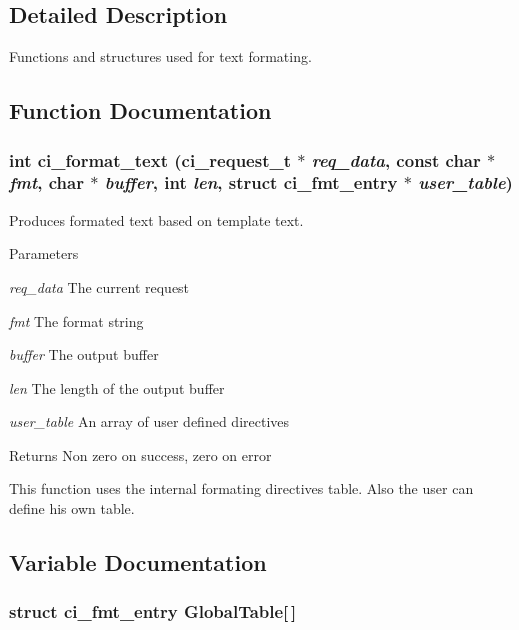 \subsection{Detailed Description}
Functions and structures used for text formating. 

\subsection{Function Documentation}
\hypertarget{group__FORMATING_ga8978e54f481917484b64eb9c3d627a69}{
\subsubsection[{ci\_\-format\_\-text}]{\setlength{\rightskip}{0pt plus 5cm}int ci\_\-format\_\-text ({\bf ci\_\-request\_\-t} $\ast$ {\em req\_\-data}, \/  const char $\ast$ {\em fmt}, \/  char $\ast$ {\em buffer}, \/  int {\em len}, \/  struct {\bf ci\_\-fmt\_\-entry} $\ast$ {\em user\_\-table})}}
\label{group__FORMATING_ga8978e54f481917484b64eb9c3d627a69}


Produces formated text based on template text. 
\begin{DoxyParams}{Parameters}
\item[{\em req\_\-data}]The current request \item[{\em fmt}]The format string \item[{\em buffer}]The output buffer \item[{\em len}]The length of the output buffer \item[{\em user\_\-table}]An array of user defined directives \end{DoxyParams}
\begin{DoxyReturn}{Returns}
Non zero on success, zero on error
\end{DoxyReturn}
This function uses the internal formating directives table. Also the user can define his own table. 

\subsection{Variable Documentation}
\hypertarget{group__FORMATING_ga11b16bbcb255ccf2325bfdaa7eecb005}{
\subsubsection[{GlobalTable}]{\setlength{\rightskip}{0pt plus 5cm}struct {\bf ci\_\-fmt\_\-entry} {\bf GlobalTable}\mbox{[}$\,$\mbox{]}}}
\label{group__FORMATING_ga11b16bbcb255ccf2325bfdaa7eecb005}


